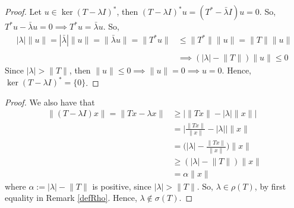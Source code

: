\documentclass{beamer}
\begin{document}
  \begin{frame}{\subsecname}
    \begin{proof}
      Let $u\in\operatorname{ker}(T-\lambda I)^{*}$, then $(T-\lambda I)^{*}u = (T^{*}-\bar{\lambda}I)u = 0$. So, $T^{*}u-\bar{\lambda}u = 0\implies T^{*}u = \bar{\lambda}u$. So,
      $$
      \begin{aligned}
        |\lambda|\lVert u\rVert = |\bar{\lambda}|\lVert u\rVert = \lVert\bar{\lambda}u\rVert = \lVert T^{*}u\rVert&\leq\lVert T^{*}\rVert\lVert u\rVert = \lVert T\rVert\lVert u\rVert\\\\
                                                                                                                  &\implies (|\lambda|-\lVert T\rVert)\lVert u\rVert\leq 0
      \end{aligned}
      $$
      Since $|\lambda|>\lVert T\rVert$, then $\lVert u\rVert\leq 0\implies \lVert u\rVert = 0\implies u=0$. Hence, $\operatorname{ker}(T-\lambda I)^{*} = \{0\}$.
    \end{proof}
  \end{frame}

  \begin{frame}{\subsecname}
    \begin{proof}
      We also have that
      $$
      \begin{aligned}
        \lVert (T-\lambda I)x\rVert = \rVert Tx-\lambda x\lVert&\geq|\lVert Tx\rVert - |\lambda|\lVert x\rVert|\\ &= \Big|\frac{\lVert Tx\rVert}{\lVert x\rVert} - |\lambda|\Big|\lVert x\rVert\\
                                                                                                               &= \Big(|\lambda|-\frac{\lVert Tx\rVert}{\lVert x\rVert}\Big)\lVert x\rVert\\
                                                                                                               &\geq (|\lambda|-\lVert T\lVert)\lVert x\rVert\\
                                                                                                               &= \alpha\lVert x\rVert
      \end{aligned}
      $$
      where $\alpha:=|\lambda|-\lVert T\rVert$ is positive, since $|\lambda|>\lVert T\rVert$. So, $\lambda\in\rho(T)$, by first equality in Remark \ref{defRho}. Hence, $\lambda\notin\sigma(T)$.
    \end{proof}
  \end{frame}
\end{document}
